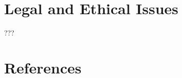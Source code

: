 \documentclass[12pt,twoside]{report}
\begin{document}
\section{Legal and Ethical Issues}

???




%
%

\section{References}


\end{document}
